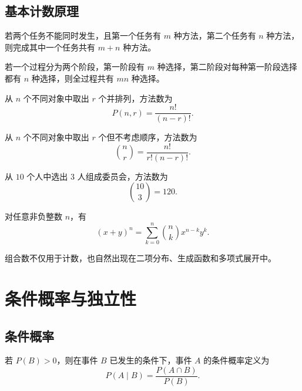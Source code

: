 \subsection{基本计数原理}

\begin{proposition}[加法原理]
若两个任务不能同时发生，且第一个任务有 $m$ 种方法，第二个任务有 $n$ 种方法，则完成其中一个任务共有 $m+n$ 种方法。
\end{proposition}

\begin{proposition}[乘法原理]
若一个过程分为两个阶段，第一阶段有 $m$ 种选择，第二阶段对每种第一阶段选择都有 $n$ 种选择，则全过程共有 $mn$ 种选择。
\end{proposition}

\begin{definition}[排列]
从 $n$ 个不同对象中取出 $r$ 个并排列，方法数为
\[
    P(n,r)=\frac{n!}{(n-r)!}.
\]
\end{definition}

\begin{definition}[组合]
从 $n$ 个不同对象中取出 $r$ 个但不考虑顺序，方法数为
\[
    \binom nr=\frac{n!}{r!(n-r)!}.
\]
\end{definition}

\begin{example}
从 $10$ 个人中选出 $3$ 人组成委员会，方法数为
\[
    \binom{10}{3}=120.
\]
\end{example}

\begin{theorem}[二项式定理]
对任意非负整数 $n$，有
\[
    (x+y)^n=\sum_{k=0}^n\binom nk x^{n-k}y^k.
\]
\end{theorem}

\begin{remark}
组合数不仅用于计数，也自然出现在二项分布、生成函数和多项式展开中。
\end{remark}

\section{条件概率与独立性}

\subsection{条件概率}

\begin{definition}[条件概率]
若 $P(B)>0$，则在事件 $B$ 已发生的条件下，事件 $A$ 的条件概率定义为
\[
    P(A\mid B)=\frac{P(A\cap B)}{P(B)}.
\]
\end{definition}

